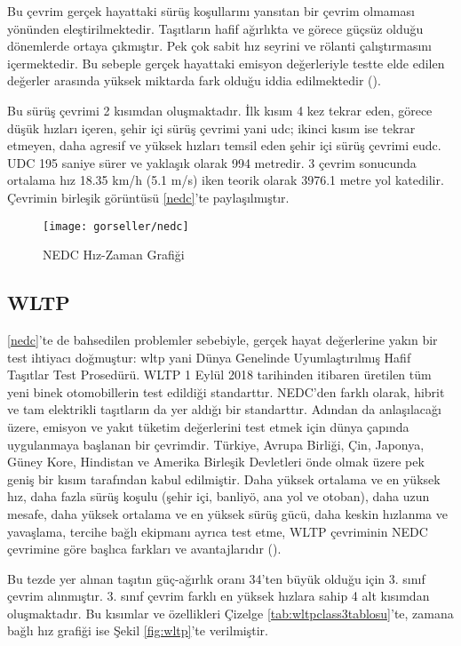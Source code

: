 Bu çevrim gerçek hayattaki sürüş koşullarını yansıtan bir çevrim olmaması yönünden eleştirilmektedir. Taşıtların hafif ağırlıkta ve görece güçsüz olduğu dönemlerde ortaya çıkmıştır. Pek çok sabit hız seyrini ve rölanti çalıştırmasını içermektedir. 
Bu sebeple gerçek hayattaki emisyon değerleriyle testte elde edilen değerler arasında yüksek miktarda fark olduğu iddia edilmektedir (\cite{nedcelestiri}).

Bu sürüş çevrimi 2 kısımdan oluşmaktadır. İlk kısım 4 kez tekrar eden, görece düşük hızları içeren, şehir içi sürüş çevrimi yani \acrfull{udc}; ikinci kısım ise tekrar etmeyen, daha agresif ve yüksek hızları temsil eden şehir içi sürüş çevrimi \acrfull{eudc}.
UDC 195 saniye sürer ve yaklaşık olarak 994 metredir. 3 çevrim sonucunda ortalama hız 18.35 km/h (5.1 m/s) iken teorik olarak 3976.1 metre yol katedilir. Çevrimin birleşik görüntüsü \ref{nedc}'te paylaşılmıştır.

\begin{figure}[h]
    \centering
    \texttt{[image: gorseller/nedc]}
    \caption{NEDC Hız-Zaman Grafiği}\label{fig:nedc}
\end{figure}

\subsection{WLTP}
\ref{nedc}'te de bahsedilen problemler sebebiyle, gerçek hayat değerlerine yakın bir test ihtiyacı doğmuştur: \acrfull{wltp} yani Dünya Genelinde Uyumlaştırılmış Hafif Taşıtlar Test Prosedürü.
WLTP 1 Eylül 2018 tarihinden itibaren üretilen tüm yeni binek otomobillerin test edildiği standarttır. NEDC'den farklı olarak, hibrit ve tam elektrikli taşıtların da yer aldığı bir standarttır. 
Adından da anlaşılacağı üzere, emisyon ve yakıt tüketim değerlerini test etmek için dünya çapında uygulanmaya başlanan bir çevrimdir. Türkiye, Avrupa Birliği, Çin, Japonya, Güney Kore, Hindistan ve Amerika Birleşik Devletleri önde olmak üzere 
pek geniş bir kısım tarafından kabul edilmiştir. Daha yüksek ortalama ve en yüksek hız, daha fazla sürüş koşulu (şehir içi, banliyö, ana yol ve otoban), daha uzun mesafe, daha yüksek ortalama ve en yüksek sürüş gücü, daha keskin hızlanma ve yavaşlama, tercihe bağlı ekipmanı ayrıca test etme, 
WLTP çevriminin NEDC çevrimine göre başlıca farkları ve avantajlarıdır (\cite{wltpnedir}). 

Bu tezde yer alınan taşıtın güç-ağırlık oranı 34'ten büyük olduğu için  3. sınıf çevrim alınmıştır. 3. sınıf çevrim farklı en yüksek hızlara sahip 4 alt kısımdan oluşmaktadır. Bu kısımlar ve özellikleri Çizelge \ref{tab:wltpclass3tablosu}'te, zamana bağlı hız grafiği ise Şekil \ref{fig:wltp}'te verilmiştir.

